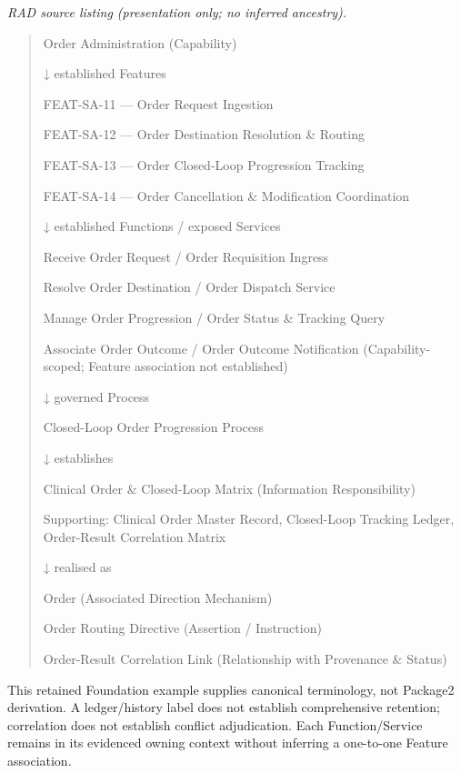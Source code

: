 \textit{RAD source listing (presentation only; no inferred ancestry).}
\begin{quote}
Order Administration (Capability)

↓ established Features

FEAT-SA-11 — Order Request Ingestion

FEAT-SA-12 — Order Destination Resolution \& Routing

FEAT-SA-13 — Order Closed-Loop Progression Tracking

FEAT-SA-14 — Order Cancellation \& Modification Coordination

↓ established Functions / exposed Services

Receive Order Request / Order Requisition Ingress

Resolve Order Destination / Order Dispatch Service

Manage Order Progression / Order Status \& Tracking Query

Associate Order Outcome / Order Outcome Notification (Capability-scoped; Feature association not established)

↓ governed Process

Closed-Loop Order Progression Process

↓ establishes

Clinical Order \& Closed-Loop Matrix (Information Responsibility)

Supporting: Clinical Order Master Record, Closed-Loop Tracking Ledger, Order-Result Correlation Matrix

↓ realised as

Order (Associated Direction Mechanism)

Order Routing Directive (Assertion / Instruction)

Order-Result Correlation Link (Relationship with Provenance \& Status)
\end{quote}
\label{rad:traceability:129}

This retained Foundation example supplies canonical terminology, not Package2 derivation. A ledger/\allowbreak{}history label does not establish comprehensive retention; correlation does not establish conflict adjudication. Each Function/\allowbreak{}Service remains in its evidenced owning context without inferring a one-to-one Feature association.

\label{rad:traceability:131}

\par\smallskip
{}\label{rad:traceability:133}
